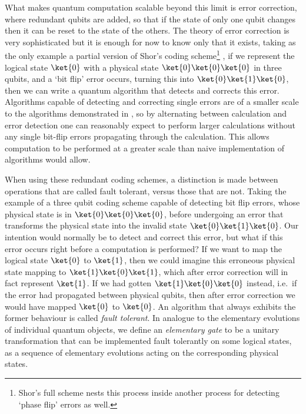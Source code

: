 What makes quantum computation scalable beyond this limit is error correction, where redundant qubits are added, so that if the state of only one qubit changes then it can be reset to the state of the others. The theory of error correction is very sophisticated but it is enough for now to know only that it exists, taking as the only example a partial version of Shor's coding scheme\footnote{Shor's full scheme nests this process inside another process for detecting `phase flip' errors as well.} \cite{shor-encoding}, if we represent the logical state $\ket{0}$ with a physical state $\ket{0}\ket{0}\ket{0}$ in three qubits, and a `bit flip' error occurs, turning this into $\ket{0}\ket{1}\ket{0}$, then we can write a quantum algorithm that detects and corrects this error. Algorithms capable of detecting and correcting single errors are of a smaller scale to the algorithms demonstrated in \cite{algos}, so by alternating between calculation and error detection one can reasonably expect to perform larger calculations without any single bit-flip errors propagating through the calculation. This allows computation to be performed at a greater scale than naive implementation of algorithms would allow.

When using these redundant coding schemes, a distinction is made between operations that are called fault tolerant, versus those that are not. Taking the example of a three qubit coding scheme capable of detecting bit flip errors, whose physical state is in $\ket{0}\ket{0}\ket{0}$, before undergoing an error that transforms the physical state into the invalid state $\ket{0}\ket{1}\ket{0}$. Our intention would normally be to detect and correct this error, but what if this error occurs right before a computation is performed? If we want to map the logical state $\ket{0}$ to $\ket{1}$, then we could imagine this erroneous physical state mapping to $\ket{1}\ket{0}\ket{1}$, which after error correction will in fact represent $\ket{1}$. If we had gotten $\ket{1}\ket{0}\ket{0}$ instead, i.e.\ if the error had propagated between physical qubits, then after error correction we would have mapped $\ket{0}$ to $\ket{0}$. An algorithm that always exhibits the former behaviour is called \emph{fault tolerant}. In analogue to the elementary evolutions of individual quantum objects, we define an \emph{elementary gate} to be a unitary transformation that can be implemented fault tolerantly on some logical states, as a sequence of elementary evolutions acting on the corresponding physical states.

